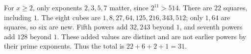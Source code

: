 For $x\ge2$, only exponents $2,3,5,7$ matter, since $2^{11}>514$. There are $22$ squares, including $1$. The eight cubes are $1,8,27,64,125,216,343,512$; only $1,64$ are squares, so six are new. Fifth powers add $32,243$ beyond $1$, and seventh powers add $128$ beyond $1$. These added values are distinct and are not earlier powers by their prime exponents. Thus the total is $\boxed{22+6+2+1=31}$.
